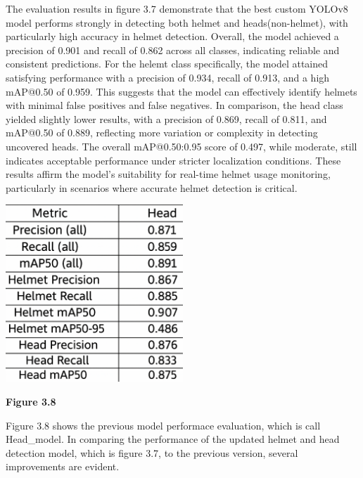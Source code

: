 \noindent\hspace{2.5em}The evaluation results in figure 3.7 demonstrate that the best custom YOLOv8 model performs strongly in detecting both helmet and heads(non-helmet), with particularly high accuracy in helmet detection. Overall, the model achieved a precision of 0.901 and recall of 0.862 across all classes, indicating reliable and consistent predictions. For the helemt class specifically, the model attained satisfying performance with a precision of 0.934, recall of 0.913, and a high mAP@0.50 of 0.959. This suggests that the model can effectively identify helmets with minimal false positives and false negatives. In comparison, the head class yielded slightly lower results, with a precision of 0.869, recall of 0.811, and mAP@0.50 of 0.889, reflecting more variation or complexity in detecting uncovered heads. The overall mAP@0.50:0.95 score of 0.497, while moderate, still indicates acceptable performance under stricter localization conditions. These results affirm the model’s suitability for real-time helmet usage monitoring, particularly in scenarios where accurate helmet detection is critical.

\begin{center}
	\includegraphics[width=0.5\textwidth]{performance.eva2.png}
	
	\vspace{0.5em}
	\textbf{Figure 3.8}
\end{center}
\noindent\hspace{2.5em}Figure 3.8 shows the previous model performace evaluation, which is call Head\_model. In comparing the performance of the updated helmet and head detection model, which is figure 3.7, to the previous version, several improvements are evident. 

